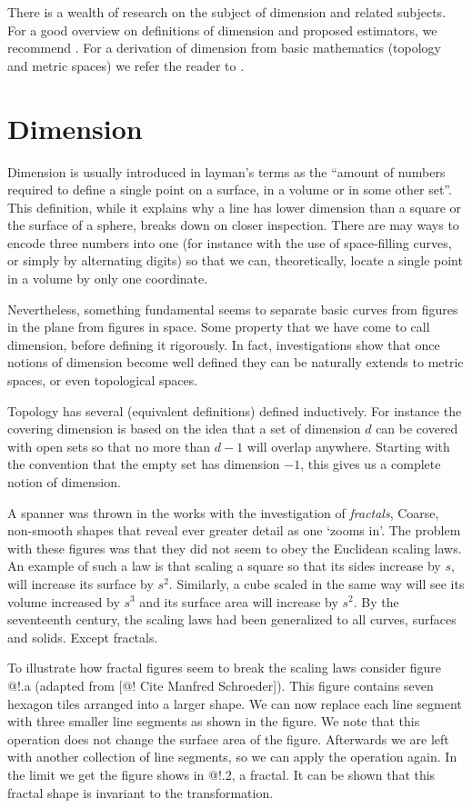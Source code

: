 \documentclass[11pt]{article}
\begin{document}
There is a wealth of research on the subject of dimension and related subjects. For a good overview on definitions of dimension and proposed estimators, we recommend \cite{theiler1990estimating}. For a derivation of dimension from basic mathematics (topology and metric spaces) we refer the reader to \cite{edgar2008measure}.

\section{Dimension}

Dimension is usually introduced in layman's terms as the ``amount of numbers required to define a single point on a surface, in a volume or in some other set''. This definition, while it explains why a line has lower dimension than a square or the surface of a sphere, breaks down on closer inspection. There are may ways to encode three numbers into one (for instance with the use of space-filling curves, or simply by alternating digits) so that we can, theoretically, locate a single point in a volume by only one coordinate. 

Nevertheless, something fundamental seems to separate basic curves from figures in the plane from figures in space. Some property that we have come to call dimension, before defining it rigorously. In fact, investigations show that once notions of dimension become well defined they can be naturally extends to metric spaces, or even topological spaces. 

Topology has several (equivalent definitions) defined inductively. For instance the covering dimension is based on the idea that a set of dimension $d$ can be covered with open sets so that no more than $d-1$ will overlap anywhere. Starting with the convention that the empty set has dimension $-1$, this gives us a complete notion of dimension.

A spanner was thrown in the works with the investigation of \textit{fractals}, Coarse, non-smooth shapes that reveal ever greater detail as one `zooms in'. The problem with these figures was that they did not seem to obey the Euclidean scaling laws. An example of such a law is that scaling a square so that its sides increase by $s$, will increase its surface by $s^2$. Similarly, a cube scaled in the same way will see its volume increased by $s^3$ and its surface area will increase by $s^2$. By the seventeenth century, the scaling laws had been generalized to all curves, surfaces and solids. Except fractals.

To illustrate how fractal figures seem to break the scaling laws consider figure @!.a (adapted from [@! Cite Manfred Schroeder]). This figure contains seven hexagon tiles arranged into a larger shape. We can now replace each line segment with three smaller line segments as shown in the figure. We note that this operation does not change the surface area of the figure. Afterwards we are left with another collection of line segments, so we can apply the operation again. In the limit we get the figure shows in @!.2, a fractal. It can be shown that this fractal shape is invariant to the transformation.
\end{document}
